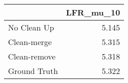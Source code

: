 \begin{tabular}{lr}
\toprule
{} & LFR_mu_10 \\
\midrule
No Clean Up  &     5.145 \\
Clean-merge  &     5.315 \\
Clean-remove &     5.318 \\
Ground Truth &     5.322 \\
\bottomrule
\end{tabular}
